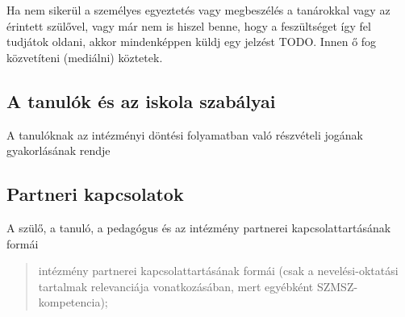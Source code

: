 Ha nem sikerül a személyes egyeztetés vagy megbeszélés a tanárokkal vagy
az érintett szülővel, vagy már nem is hiszel benne, hogy a feszültséget
így fel tudjátok oldani, akkor mindenképpen küldj egy jelzést TODO. Innen ő fog
közvetíteni (mediálni) köztetek.

\subsection{A tanulók és az iskola
  szabályai}\label{a-tanuluxf3k-uxe9s-az-iskola-szabuxe1lyai}

A tanulóknak az intézményi döntési folyamatban való részvételi jogának
gyakorlásának rendje

\subsection{Partneri kapcsolatok}\label{partneri-kapcsolatok}

A szülő, a tanuló, a pedagógus és az intézmény partnerei
kapcsolattartásának formái

\begin{quote}
  intézmény partnerei kapcsolattartásának formái (csak a nevelési-oktatási
  tartalmak relevanciája vonatkozásában, mert egyébként
  SZMSZ-kompetencia);
\end{quote}
